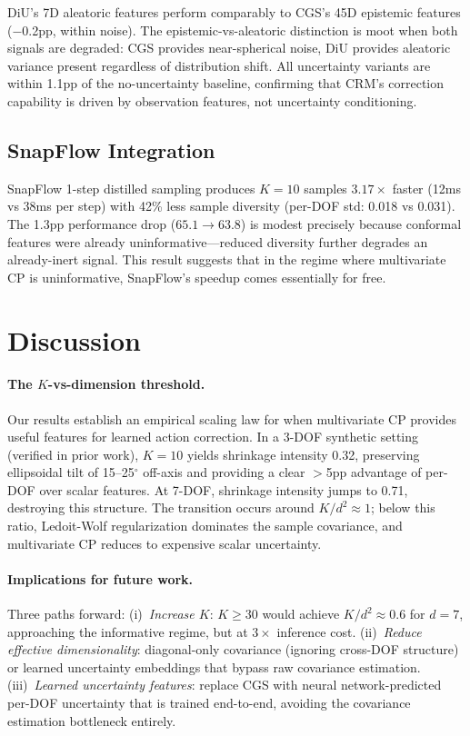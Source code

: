 \documentclass[letterpaper]{article}
\begin{document}
DiU's 7D aleatoric features perform comparably to CGS's 45D epistemic features ($-$0.2pp, within noise).
The epistemic-vs-aleatoric distinction is moot when both signals are degraded: CGS provides near-spherical noise, DiU provides aleatoric variance present regardless of distribution shift.
All uncertainty variants are within 1.1pp of the no-uncertainty baseline, confirming that CRM's correction capability is driven by observation features, not uncertainty conditioning.

\subsection{SnapFlow Integration}

SnapFlow 1-step distilled sampling produces $K{=}10$ samples $3.17\times$ faster (12ms vs 38ms per step) with 42\% less sample diversity (per-DOF std: 0.018 vs 0.031).
The 1.3pp performance drop ($65.1 \to 63.8$) is modest precisely because conformal features were already uninformative---reduced diversity further degrades an already-inert signal.
This result suggests that in the regime where multivariate CP is uninformative, SnapFlow's speedup comes essentially for free.

\section{Discussion}

\paragraph{The $K$-vs-dimension threshold.}
Our results establish an empirical scaling law for when multivariate CP provides useful features for learned action correction.
In a 3-DOF synthetic setting (verified in prior work), $K{=}10$ yields shrinkage intensity 0.32, preserving ellipsoidal tilt of 15--25$^\circ$ off-axis and providing a clear $>$5pp advantage of per-DOF over scalar features.
At 7-DOF, shrinkage intensity jumps to 0.71, destroying this structure.
The transition occurs around $K/d^2 \approx 1$; below this ratio, Ledoit-Wolf regularization dominates the sample covariance, and multivariate CP reduces to expensive scalar uncertainty.

\paragraph{Implications for future work.}
Three paths forward:
(i)~\emph{Increase $K$}: $K \geq 30$ would achieve $K/d^2 \approx 0.6$ for $d{=}7$, approaching the informative regime, but at $3\times$ inference cost.
(ii)~\emph{Reduce effective dimensionality}: diagonal-only covariance (ignoring cross-DOF structure) or learned uncertainty embeddings that bypass raw covariance estimation.
(iii)~\emph{Learned uncertainty features}: replace CGS with neural network-predicted per-DOF uncertainty that is trained end-to-end, avoiding the covariance estimation bottleneck entirely.
\end{document}
